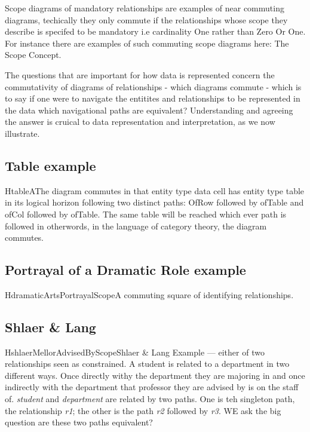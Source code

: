 Scope diagrams of mandatory relationships are examples of near commuting diagrams, techically they only commute if the relationships whose scope they describe is specifed to be mandatory i.e cardinality One rather than Zero Or One. For instance there are examples of such commuting scope diagrams here: The Scope Concept.

The questions that are important for how data is represented concern the commutativity of diagrams of relationships - which diagrams commute - which is to say if one were to navigate the entitites and relationships to be represented in the data which navigational paths are equivalent? Understanding and agreeing the answer is cruical to data representation and interpretation, as we now illustrate.

\subsection{Table example}
\begin{erboxedFigure}{H}{tableA}{The diagram commutes in that entity type data cell has entity type table in its logical horizon following two distinct paths: OfRow followed by ofTable and ofCol followed by ofTable. The same table will be reached which ever path is followed in otherwords, in the language of category theory, the diagram commutes.}

\end{erboxedFigure}

\subsection{Portrayal of a Dramatic Role example}
\begin{erboxedFigure}{H}{dramaticArtsPortrayalScope}{A commuting square of identifying relationships.}

\end{erboxedFigure}

\subsection{Shlaer \& Lang}
\begin{erboxedFigure}{H}{shlaerMellorAdvisedByScope}{Shlaer \& Lang Example --- either of two relationships seen as constrained. A student is related to a department in two different ways. Once directly withy the department they are majoring in and once indirectly with the department that professor they are advised by is on the staff of. \textit{student} and \textit{department} are related by two paths. One is teh singleton path, the relationship \textit{r1}; the other is the path \textit{r2} followed by \textit{r3}. WE ask the big question are these two paths equivalent?}

\end{erboxedFigure}

